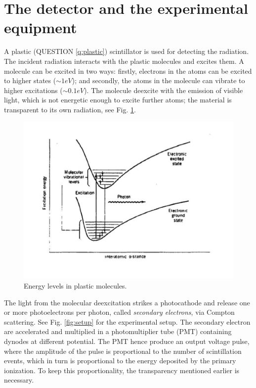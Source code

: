 \documentclass[a4,11pt, notitlepage]{article}
\begin{document}
\section{The detector and the experimental equipment}

A plastic (QUESTION \ref{q:plastic}) scintillator is used for detecting the radiation. The incident radiation interacts with the plastic molecules and excites them. A molecule can be excited in two ways: firstly, electrons in the atoms can be excited to higher states ($\sim 1 eV$); and secondly, the atoms in the molecule can vibrate to higher excitations ($\sim 0.1 eV$). The molecule deexcite with the emission of visible light, which is not energetic enough to excite further atoms; the material is transparent to its own radiation, see Fig. \ref{fig:mol}. 

\vspace{-40pt}
\begin{figure}[htp]
  \vspace{40pt}
  \begin{center}
    \includegraphics[width=15.0cm]{figures/Energy.png}
    \caption{Energy levels in plastic molecules.}
\label{fig:mol}
  \end{center}
\end{figure}


The light from the molecular deexcitation strikes a photocathode and release one or more photoelectrons per photon, called \textit{secondary electrons}, via Compton scattering. See Fig. \ref{fig:setup} for the experimental setup. The secondary electron are accelerated and multiplied in a photomultiplier tube (PMT) containing dynodes at different potential. The PMT hence produce an output voltage pulse, where the amplitude of the pulse is proportional to the number of scintillation events, which in turn is proportional to the energy deposited by the primary ionization. To keep this proportionality, the transparency mentioned earlier is necessary.  
\end{document}
